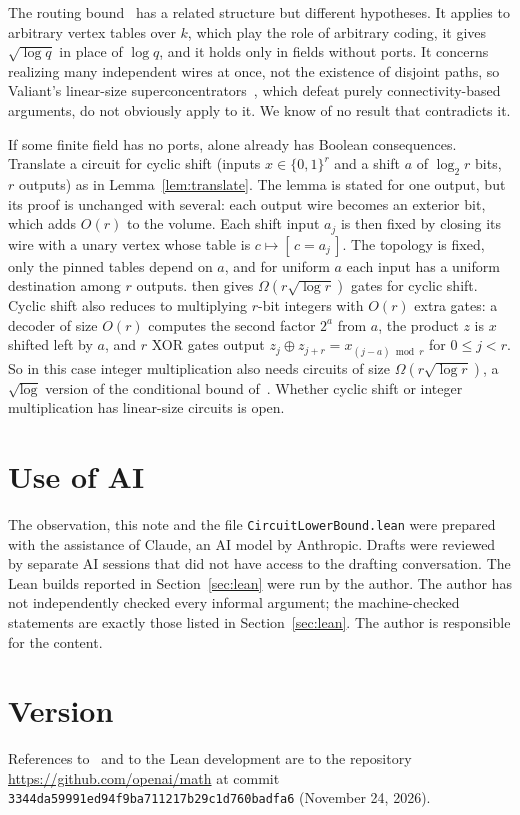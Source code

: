 \documentclass[11pt]{article}
\theoremstyle{definition}
\begin{document}
The routing bound~\cite[Lemma~4.1]{OAI-MM} has a related structure but different hypotheses. It applies to arbitrary vertex tables over $k$, which play the role of arbitrary coding, it gives $\sqrt{\log q}$ in place of $\log q$, and it holds only in fields without ports. It concerns realizing many independent wires at once, not the existence of disjoint paths, so Valiant's linear-size superconcentrators~\cite{Val76}, which defeat purely connectivity-based arguments, do not obviously apply to it. We know of no result that contradicts it.

If some finite field has no ports, \cite[Lemma~4.1]{OAI-MM} alone already has Boolean consequences. Translate a circuit for cyclic shift (inputs $x\in\{0,1\}^r$ and a shift $a$ of $\log_2 r$ bits, $r$ outputs) as in Lemma~\ref{lem:translate}. The lemma is stated for one output, but its proof is unchanged with several: each output wire becomes an exterior bit, which adds $O(r)$ to the volume. Each shift input $a_j$ is then fixed by closing its wire with a unary vertex whose table is $c\mapsto[\,c=a_j\,]$. The topology is fixed, only the pinned tables depend on $a$, and for uniform $a$ each input has a uniform destination among $r$ outputs. \cite[Lemma~4.1]{OAI-MM} then gives $\Omega(r\sqrt{\log r})$ gates for cyclic shift. Cyclic shift also reduces to multiplying $r$-bit integers with $O(r)$ extra gates: a decoder of size $O(r)$ computes the second factor $2^a$ from $a$, the product $z$ is $x$ shifted left by $a$, and $r$ XOR gates output $z_j\oplus z_{j+r}=x_{(j-a)\bmod r}$ for $0\le j<r$. So in this case integer multiplication also needs circuits of size $\Omega(r\sqrt{\log r})$, a $\sqrt{\log}$ version of the conditional bound of~\cite{AFKL19}. Whether cyclic shift or integer multiplication has linear-size circuits is open.

\section*{Use of AI}
The observation, this note and the file \texttt{CircuitLowerBound.lean} were prepared with the assistance of Claude, an AI model by Anthropic. Drafts were reviewed by separate AI sessions that did not have access to the drafting conversation. The Lean builds reported in Section~\ref{sec:lean} were run by the author. The author has not independently checked every informal argument; the machine-checked statements are exactly those listed in Section~\ref{sec:lean}. The author is responsible for the content.

\section*{Version}
References to~\cite{OAI-MM,OAI-Euc,OAI-HC} and to the Lean development are to the repository \url{https://github.com/openai/math} at commit \texttt{3344da59991ed94f9ba711217b29c1d760badfa6} (November 24, 2026).



\end{document}
